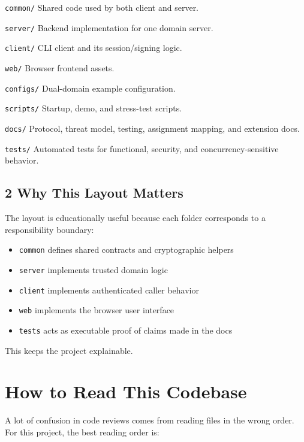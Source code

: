 \documentclass[11pt,a4paper]{article}
\begin{document}
\nolinkurl{common/} Shared code used by both client and server.

\nolinkurl{server/} Backend implementation for one domain server.

\nolinkurl{client/} CLI client and its session/signing logic.

\nolinkurl{web/} Browser frontend assets.

\nolinkurl{configs/} Dual-domain example configuration.

\nolinkurl{scripts/} Startup, demo, and stress-test scripts.

\nolinkurl{docs/} Protocol, threat model, testing, assignment mapping, and extension docs.

\nolinkurl{tests/} Automated tests for functional, security, and concurrency-sensitive behavior.

\subsection{2 Why This Layout Matters}

The layout is educationally useful because each folder corresponds to a responsibility boundary:

\begin{itemize}
\item \nolinkurl{common} defines shared contracts and cryptographic helpers
\item \nolinkurl{server} implements trusted domain logic
\item \nolinkurl{client} implements authenticated caller behavior
\item \nolinkurl{web} implements the browser user interface
\item \nolinkurl{tests} acts as executable proof of claims made in the docs
\end{itemize}

This keeps the project explainable.


\section{How to Read This Codebase}

A lot of confusion in code reviews comes from reading files in the wrong order. For this project, the best reading order is:
\end{document}
